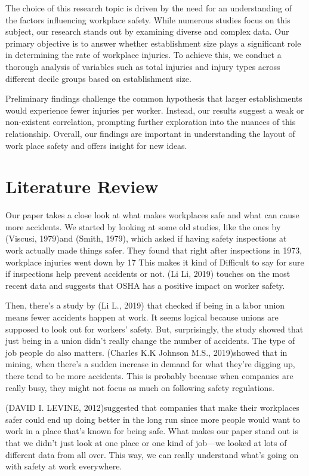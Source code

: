 \documentclass[12pt]{article}
\begin{document}
The choice of this research topic is driven by the need for an understanding of the factors influencing workplace safety. While numerous studies focus on this subject, our research stands out by examining diverse and complex data. Our primary objective is to answer whether establishment size plays a significant role in determining the rate of workplace injuries. To achieve this, we conduct a thorough analysis of variables such as total injuries and injury types across different decile groups based on establishment size.

Preliminary findings challenge the common hypothesis that larger establishments would experience fewer injuries per worker. Instead, our results suggest a weak or non-existent correlation, prompting further exploration into the nuances of this relationship. Overall, our findings are important in understanding the layout of work place safety and offers insight for new ideas. 

\section{Literature Review} \label{sec:literature}

Our paper takes a close look at what makes workplaces safe and what can cause more accidents. We started by looking at some old studies, like the ones by (Viscusi, 1979)and (Smith, 1979), which asked if having safety inspections at work actually made things safer. They found that right after inspections in 1973, workplace injuries went down by 17%
This makes it kind of Difficult to say for sure if inspections help prevent accidents or not. (Li Li, 2019) touches on the most recent data and suggests that OSHA has a positive impact on worker safety.  

Then, there's a study by (Li L., 2019) that checked if being in a labor union means fewer accidents happen at work. It seems logical because unions are supposed to look out for workers' safety. But, surprisingly, the study showed that just being in a union didn't really change the number of accidents. The type of job people do also matters. (Charles K.K Johnson M.S., 2019)showed that in mining, when there's a sudden increase in demand for what they're digging up, there tend to be more accidents. This is probably because when companies are really busy, they might not focus as much on following safety regulations. 

(DAVID I. LEVINE, 2012)suggested that companies that make their workplaces safer could end up doing better in the long run since more people would want to work in a place that's known for being safe. 
What makes our paper stand out is that we didn't just look at one place or one kind of job—we looked at lots of different data from all over. This way, we can really understand what's going on with safety at work everywhere. 
\end{document}
